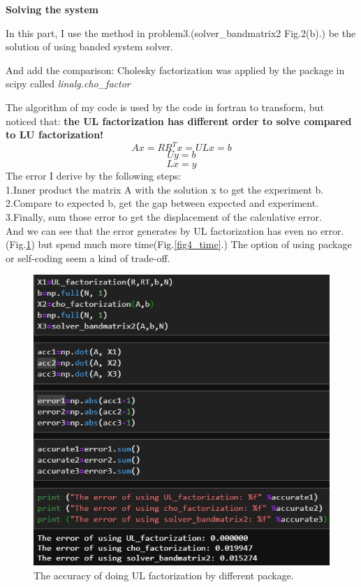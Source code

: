 \documentclass{article}
\begin{document}
\textbf{Solving the system}

In this part, I use the method in problem3.(solver\_bandmatrix2 Fig.2(b).) be the solution of using banded system solver.

And add the comparison: Cholesky factorization was applied by the package in scipy called \emph{linalg.cho\_factor}

The algorithm of my code is used by the code in fortran to transform,
but noticed that: \textbf{the UL factorization has different order to solve compared to LU factorization!}\\
\begin{equation}
    Ax=RR^Tx=ULx=b
\end{equation}
$$Uy=b$$
$$Lx=y$$
The error I derive by the following steps:\\
1.Inner product the matrix A with the solution x to get the experiment b.\\
2.Compare to expected b, get the gap between expected and experiment.\\
3.Finally, sum those error to get the displacement of the calculative error.\\

And we can see that the error generates by UL factorization has even no error.(Fig.\ref{fig4_error}) but spend much more time(Fig.\ref{fig4_time}.) The option of using package or self-coding seem a kind of trade-off.\\

\begin{figure}[h]
    \centering 
	\includegraphics[scale=0.55]{pro4_error.jpg}
	\caption{The accuracy of doing UL factorization by different package.} %
	\label{fig4_error} %
\end{figure}
\end{document}
